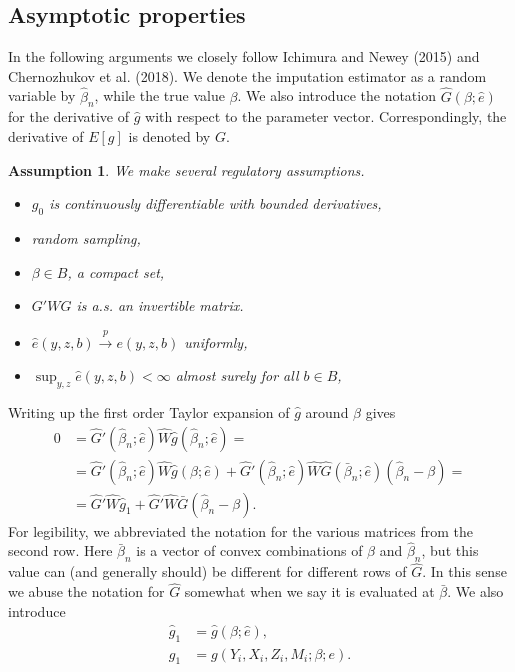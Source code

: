 \documentclass{article}
\newtheorem{assumption}{Assumption}
\theoremstyle{definition}
\theoremstyle{remark}
\begin{document}
\subsection{Asymptotic properties}
In the following arguments we closely follow Ichimura and Newey (2015) and Chernozhukov et al. (2018). We denote the imputation estimator as a random variable by $\hat{\beta}_n$, while the true value $\beta$. We also introduce the notation $\hat{G}(\beta;\hat{e})$ for the derivative of $\hat{g}$ with respect to the parameter vector. Correspondingly, the derivative of $E[g]$ is denoted by $G$.

\begin{assumption}\label{ass_regulatory1}
	We make several regulatory assumptions.
	\begin{itemize}
		\item $g_0$ is continuously differentiable with bounded derivatives,
		\item random sampling,
		\item $\beta \in B$, a compact set,
		\item $G'WG$ is a.s. an invertible matrix.
		\item $\hat{e}(y,z, b)\stackrel{p}{\rightarrow} e(y,z, b)$ uniformly,
		\item $\sup_{y,z}\hat{e}(y,z, b)<\infty$ almost surely for all $b \in B$,
	\end{itemize}
\end{assumption}

Writing up the first order Taylor expansion of $\hat{g}$ around $\beta$ gives
\begin{align}
    0&=\hat{G}'(\hat{\beta}_n;\hat{e})\hat{W}\hat{g}(\hat{\beta}_n;\hat{e})= \\ &=\hat{G}'(\hat{\beta}_n;\hat{e})\hat{W}\hat{g}(\beta;\hat{e})+ \hat{G}'(\hat{\beta}_n;\hat{e})\hat{W}\hat{G}(\bar{\beta}_n;\hat{e})(\hat{\beta}_n-\beta)= \nonumber \\
    &= \hat{G}'\hat{W}\hat{g}_1+ \hat{G}'\hat{W}\bar{G}(\hat{\beta}_n-\beta). \nonumber
    \end{align}
For legibility, we abbreviated the notation for the various matrices from the second row. Here $\bar{\beta}_n$ is a vector of convex combinations of $\beta$ and $\hat{\beta}_n$, but this value can (and generally should) be different for different rows of $\hat{G}$. In this sense we abuse the notation for $\hat{G}$ somewhat when we say it is evaluated at $\bar{\beta}$. We also introduce
\begin{align}
\hat{g}_1&=\hat{g}(\beta;\hat{e}), \\
g_1 &= g(Y_i, X_i, Z_i, M_i; \beta; e).
\end{align}
\end{document}
